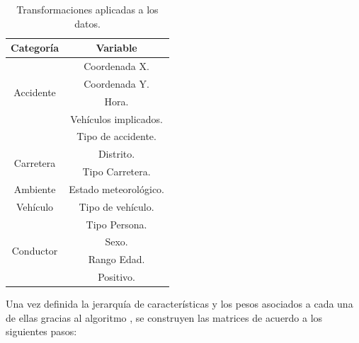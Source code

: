         \begin{table}[H]
          \centering
          \begin{tabular}{ |c|c| }
               \hline
               \textbf{Categoría} & \textbf{Variable}\\

               \hline
               \multirow{4}{*}{Accidente}            & Coordenada X.\\
                                                     & Coordenada Y.\\
                                                     & Hora.\\
                                                     & Vehículos implicados.\\
                                                     & Tipo de accidente.\\

               \hline
               \multirow{2}{*}{Carretera}            & Distrito.\\
                                                     & Tipo Carretera.\\


               \hline
               \multirow{1}{*}{Ambiente}             & Estado meteorológico.\\

               \hline
               \multirow{1}{*}{Vehículo}             & Tipo de vehículo.\\

               \hline
               \multirow{4}{*}{Conductor}            & Tipo Persona.\\
                                                     & Sexo.\\
                                                     & Rango Edad.\\
                                                     & Positivo.\\

               \hline
          \end{tabular}
          \caption{Transformaciones aplicadas a los datos.}
          \label{JerarquiaCaracteristicasTabla}
        \end{table}



        Una vez definida la jerarquía de características y los pesos asociados a cada una de ellas gracias al algoritmo , se construyen las matrices de acuerdo a los siguientes pasos:

